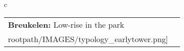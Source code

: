 \begin{table}[H]
        \begin{tabular}{c}
        \begin{tabular}{m{1.5in} m{2in}}
\textbf{Breukelen:} {Low-rise in the park} & \texttt{[image: \\rootpath/IMAGES/typology\_earlytower.png]}
\end{tabular}\end{tabular}
        \end{table}